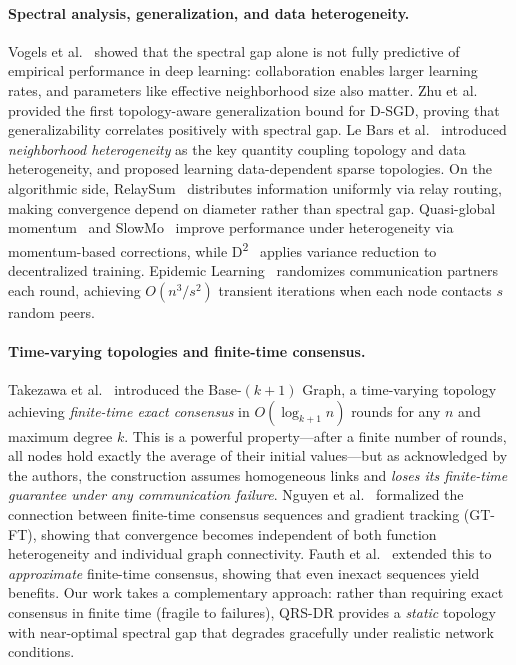 \documentclass{article}
\begin{document}
\paragraph{Spectral analysis, generalization, and data heterogeneity.}
Vogels et al.~\cite{vogels2022beyondgap} showed that the spectral gap
alone is not fully predictive of empirical performance in deep learning:
collaboration enables larger learning rates, and parameters like
effective neighborhood size also matter.
Zhu et al.~\cite{zhu2022topaware} provided the first topology-aware
generalization bound for D-SGD, proving that generalizability
correlates positively with spectral gap.
Le Bars et al.~\cite{lebars2023neighborhood} introduced
\emph{neighborhood heterogeneity} as the key quantity coupling topology
and data heterogeneity, and proposed learning data-dependent sparse
topologies.
On the algorithmic side, RelaySum~\cite{vogels2021relaysum} distributes
information uniformly via relay routing, making convergence depend on
diameter rather than spectral gap.
Quasi-global momentum~\cite{lin2021qgm} and
SlowMo~\cite{wang2020slowmo} improve performance under heterogeneity
via momentum-based corrections, while
D\textsuperscript{2}~\cite{tang2018d2} applies variance reduction to
decentralized training.
Epidemic Learning~\cite{devos2023epidemic} randomizes communication
partners each round, achieving $O(n^3/s^2)$ transient iterations when
each node contacts $s$ random peers.

\paragraph{Time-varying topologies and finite-time consensus.}
Takezawa et al.~\cite{takezawa2023base} introduced the Base-$(k{+}1)$
Graph, a time-varying topology achieving \emph{finite-time exact
consensus} in $O(\log_{k+1} n)$ rounds for any $n$ and maximum degree
$k$.  This is a powerful property---after a finite number of rounds,
all nodes hold exactly the average of their initial values---but as
acknowledged by the authors, the construction assumes homogeneous links
and \emph{loses its finite-time guarantee under any communication
failure}.
Nguyen et al.~\cite{nguyen2025gtft} formalized the connection between
finite-time consensus sequences and gradient tracking (GT-FT), showing
that convergence becomes independent of both function heterogeneity and
individual graph connectivity.  Fauth et al.~\cite{fauth2025approxftc}
extended this to \emph{approximate} finite-time consensus, showing that
even inexact sequences yield benefits.
Our work takes a complementary approach: rather than requiring exact
consensus in finite time (fragile to failures), QRS-DR
provides a \emph{static} topology with near-optimal spectral gap that
degrades gracefully under realistic network conditions.
\end{document}
